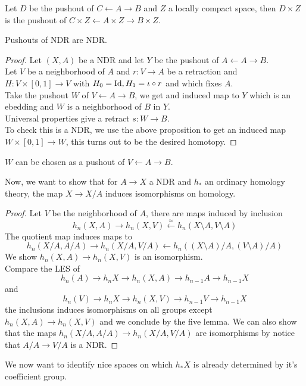 \documentclass[../main.tex]{subfiles}
\begin{document}
\begin{crly}
Let $D$ be the pushout of $C\leftarrow A \to B$ and $Z$ a locally compact space, then $D\times Z$ is the pushout of $C\times Z \leftarrow A \times Z \to B\times Z$.
\end{crly}
\begin{propo}
Pushouts of NDR are NDR.
\end{propo}
\begin{proof}
Let $( X,A) $ be a NDR and let $Y$ be the pushout of $A\leftarrow A \to B$.\\
Let $V$ be a neighborhood of $A$ and $r:V\to A$ be a retraction and $H:V\times [ 0,1] \to V$ with $H_0= \operatorname{Id}, H_1= \iota\circ r$ and which fixes $A$.\\
Take the pushout $W$ of $V\leftarrow A \to B$, we get and induced map to $Y$ which is an ebedding and $W$ is a neighborhood of $B $ in $Y$.\\
Universal properties give a retract $s:W\to B$.\\
To check this is a NDR, we use the above proposition to get an induced map $W\times [ 0,1] \to W$, this turns out to be the desired homotopy.
\end{proof}
\begin{rmq}
$W$ can be chosen as a pushout of $V\leftarrow A \to B$.
\end{rmq}
Now, we want to show that for $A\to X$ a NDR and $h_\ast$ an ordinary homology theory, the map $X\to X /A$ induces isomorphisms on homology.
\begin{proof}
Let $V$ be the neighborhood of $A$, there are maps induced by inclusion
\[ 
h_n( X,A) \to h_n( X,V) \xleftarrow\simeq h_n( X\setminus A, V\setminus A) 
\]
The quotient map induces maps to
\[ 
h_n( X /A, A /A) \to h_n( X /A, V /A) \leftarrow h_n( ( X\setminus A) / A, ( V\setminus A) /A) 
\]
We show $h_n( X,A) \to h_n( X,V) $ is an isomorphism.\\
Compare the LES of
\[ 
h_n( A) \to h_{n} X \to h_n( X,A) \to h_{n-1} A \to h_{n-1} X
\]
and
\[ 
h_n( V) \to h_n X \to h_n( X,V) \to h_{n-1} V\to h_{n-1} X
\]
the inclusions induces isomorphisms on all groups except $h_n( X,A) \to h_n( X,V) $ and we conclude by the five lemma.
We can also show that the maps $h_n( X /A, A/A) \to h_n( X /A, V /A) $ are isomorphisms by notice that $ A/ A\to V /A$ is a NDR.
\end{proof}
We now want to identify nice spaces on which $h_\ast X$ is already determined by it's coefficient group.
\end{document}
